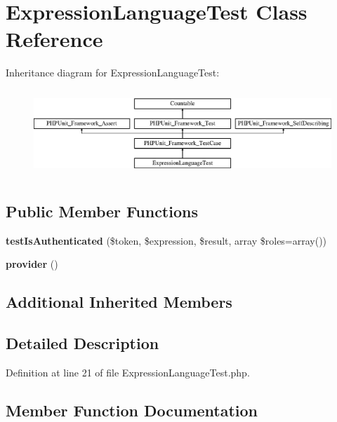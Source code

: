 \section{Expression\+Language\+Test Class Reference}
\label{class_symfony_1_1_component_1_1_security_1_1_core_1_1_tests_1_1_authorization_1_1_expression_language_test}
Inheritance diagram for Expression\+Language\+Test\+:\begin{figure}[H]
\begin{center}
\leavevmode
\includegraphics[height=3.303835cm]{class_symfony_1_1_component_1_1_security_1_1_core_1_1_tests_1_1_authorization_1_1_expression_language_test}
\end{center}
\end{figure}
\subsection*{Public Member Functions}
\begin{DoxyCompactItemize}
\item 
{\bf test\+Is\+Authenticated} (\$token, \$expression, \$result, array \$roles=array())
\item 
{\bf provider} ()
\end{DoxyCompactItemize}
\subsection*{Additional Inherited Members}


\subsection{Detailed Description}


Definition at line 21 of file Expression\+Language\+Test.\+php.



\subsection{Member Function Documentation}
